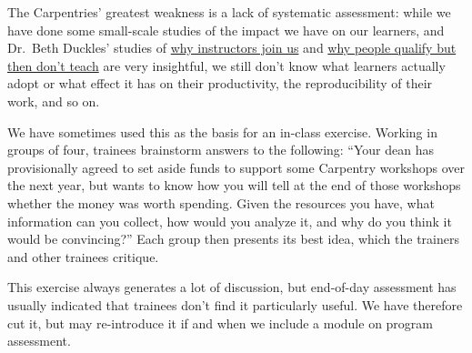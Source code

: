 
The Carpentries' greatest weakness is a lack of systematic assessment:
while we have done some small-scale studies of the impact we have on our
learners, and Dr.~Beth Duckles' studies of
\href{http://software-carpentry.org/files/bib/duckles-instructor-engagement-2016.pdf}{why
instructors join us} and
\href{http://software-carpentry.org/files/bib/duckles-non-instructor-report-2016.pdf}{why
people qualify but then don't teach} are very insightful, we still don't
know what learners actually adopt or what effect it has on their
productivity, the reproducibility of their work, and so on.

We have sometimes used this as the basis for an in-class exercise.
Working in groups of four, trainees brainstorm answers to the following:
``Your dean has provisionally agreed to set aside funds to support some
Carpentry workshops over the next year, but wants to know how you will
tell at the end of those workshops whether the money was worth spending.
Given the resources you have, what information can you collect, how
would you analyze it, and why do you think it would be convincing?''
Each group then presents its best idea, which the trainers and other
trainees critique.

This exercise always generates a lot of discussion, but end-of-day
assessment has usually indicated that trainees don't find it
particularly useful. We have therefore cut it, but may re-introduce it
if and when we include a module on program assessment.

